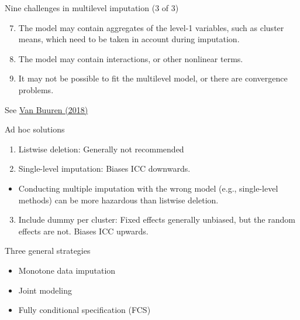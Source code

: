 \documentclass[ignorenonframetext,aspectratio=43]{beamer}
\providecommand{\tightlist}{%
  \setlength{\itemsep}{0pt}\setlength{\parskip}{0pt}}
\begin{document}
\begin{frame}{Nine challenges in multilevel imputation (3 of 3)}
\protect\hypertarget{nine-challenges-in-multilevel-imputation-3-of-3}{}

\begin{enumerate}
\setcounter{enumi}{6}
\item
  The model may contain aggregates of the level-1 variables, such as
  cluster means, which need to be taken in account during imputation.
\item
  The model may contain interactions, or other nonlinear terms.
\item
  It may not be possible to fit the multilevel model, or there are
  convergence problems.
\end{enumerate}

See \href{https://stefvanbuuren.name/fimd/sec-missmult.html}{Van Buuren
(2018)}

\end{frame}

\begin{frame}{Ad hoc solutions}
\protect\hypertarget{ad-hoc-solutions}{}

\begin{enumerate}
\tightlist
\item
  Listwise deletion: Generally not recommended
\item
  Single-level imputation: Biases ICC downwards.
\end{enumerate}

\begin{itemize}
\tightlist
\item
  Conducting multiple imputation with the wrong model (e.g.,
  single-level methods) can be more hazardous than listwise deletion.
\end{itemize}

\begin{enumerate}
\setcounter{enumi}{2}
\tightlist
\item
  Include dummy per cluster: Fixed effects generally unbiased, but the
  random effects are not. Biases ICC upwards.
\end{enumerate}

\end{frame}

\begin{frame}{Three general strategies}
\protect\hypertarget{three-general-strategies}{}

\begin{itemize}
\tightlist
\item
  Monotone data imputation
\item
  Joint modeling
\item
  Fully conditional specification (FCS)
\end{itemize}

\end{frame}
\end{document}
